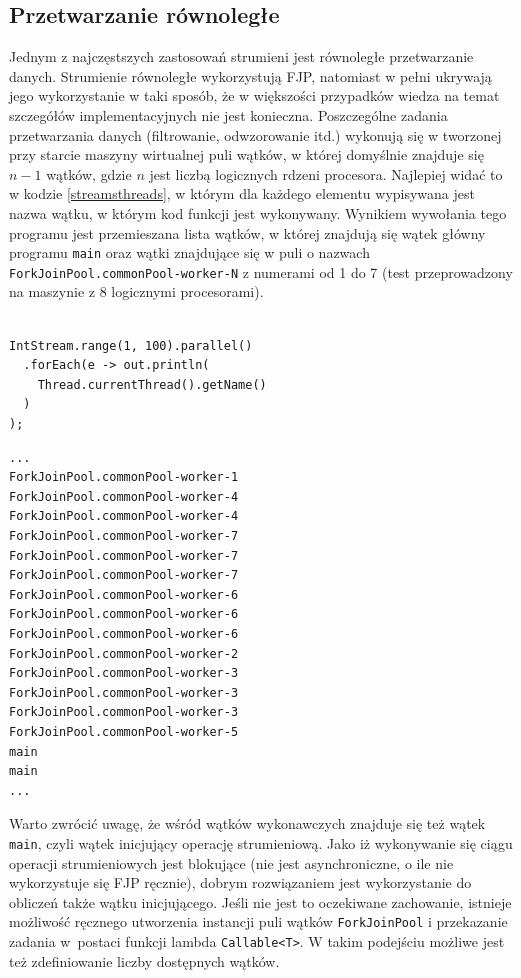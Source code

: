 \documentclass[12pt,twoside,openright]{extarticle}
\begin{document}
\subsection{Przetwarzanie równoległe}

    Jednym z najczęstszych zastosowań strumieni jest równoległe przetwarzanie danych. Strumienie równoległe wykorzystują FJP, natomiast w pełni ukrywają jego wykorzystanie w taki sposób, że w większości przypadków wiedza na temat szczegółów implementacyjnych nie jest konieczna. Poszczególne zadania przetwarzania danych (filtrowanie, odwzorowanie itd.) wykonują się w tworzonej przy starcie maszyny wirtualnej puli wątków, w której domyślnie znajduje się $ n-1 $ wątków, gdzie $ n $ jest liczbą logicznych rdzeni procesora. Najlepiej widać to w kodzie \ref{streamsthreads}, w którym dla każdego elementu wypisywana jest nazwa wątku, w którym kod funkcji jest wykonywany.  Wynikiem wywołania tego programu jest przemieszana lista wątków, w której znajdują się wątek główny programu \texttt{main} oraz wątki znajdujące się w puli o nazwach \texttt{ForkJoinPool.commonPool-worker-N} z numerami od 1 do 7 (test przeprowadzony na maszynie z 8 logicznymi procesorami).

\begin{lstlisting}[label=streamsthreads, caption=Struktura puli wątków FJP]

IntStream.range(1, 100).parallel()
  .forEach(e -> out.println(
    Thread.currentThread().getName()
  )
);

\end{lstlisting}

\begin{verbatim}
...
ForkJoinPool.commonPool-worker-1
ForkJoinPool.commonPool-worker-4
ForkJoinPool.commonPool-worker-4
ForkJoinPool.commonPool-worker-7
ForkJoinPool.commonPool-worker-7
ForkJoinPool.commonPool-worker-7
ForkJoinPool.commonPool-worker-6
ForkJoinPool.commonPool-worker-6
ForkJoinPool.commonPool-worker-6
ForkJoinPool.commonPool-worker-2
ForkJoinPool.commonPool-worker-3
ForkJoinPool.commonPool-worker-3
ForkJoinPool.commonPool-worker-3
ForkJoinPool.commonPool-worker-5
main
main
...
\end{verbatim}

    Warto zwrócić uwagę, że wśród wątków wykonawczych znajduje się też wątek \texttt{main}, czyli wątek inicjujący operację strumieniową. Jako iż wykonywanie się ciągu operacji strumieniowych jest blokujące (nie jest asynchroniczne, o ile nie wykorzystuje się FJP ręcznie), dobrym rozwiązaniem jest wykorzystanie do obliczeń także wątku inicjującego. Jeśli nie jest to oczekiwane zachowanie, istnieje możliwość ręcznego utworzenia instancji puli wątków \texttt{ForkJoinPool} i przekazanie zadania w~postaci funkcji lambda \texttt{Callable<T>}. W takim podejściu możliwe jest też zdefiniowanie liczby dostępnych wątków.
\end{document}
